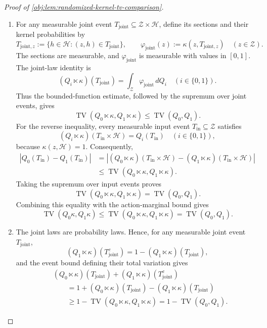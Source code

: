 \begin{proof}[Proof of \cref{obj:lem:randomized-kernel-tv-comparison}]
\begin{enumerate}
\item For any measurable joint event \(T_{\mathrm{joint}}\subseteq\mathcal Z\times\mathcal H\), define its sections and their kernel probabilities by
\[
T_{\mathrm{joint},z}
:=
\{h\in\mathcal H:(z,h)\in T_{\mathrm{joint}}\},
\qquad
\varphi_{\mathrm{joint}}(z)
:=
\kappa(z,T_{\mathrm{joint},z})
\quad(z\in\mathcal Z).
\]
The sections are measurable, and \(\varphi_{\mathrm{joint}}\) is measurable with values in \([0,1]\). The joint-law identity is
\[
(Q_i\ltimes\kappa)(T_{\mathrm{joint}})
=
\int_{\mathcal Z}\varphi_{\mathrm{joint}}\,dQ_i
\quad(i\in\{0,1\}).
\]
Thus the bounded-function estimate, followed by the supremum over joint events, gives
\[
\operatorname{TV}(Q_0\ltimes\kappa,Q_1\ltimes\kappa)
\le \operatorname{TV}(Q_0,Q_1).
\]
For the reverse inequality, every measurable input event \(T_{\mathrm{in}}\subseteq\mathcal Z\) satisfies
\[
(Q_i\ltimes\kappa)(T_{\mathrm{in}}\times\mathcal H)
=
Q_i(T_{\mathrm{in}})
\quad(i\in\{0,1\}),
\]
because \(\kappa(z,\mathcal H)=1\). Consequently,
\[
\begin{aligned}
|Q_0(T_{\mathrm{in}})-Q_1(T_{\mathrm{in}})|
&=
\left|
(Q_0\ltimes\kappa)(T_{\mathrm{in}}\times\mathcal H)
-
(Q_1\ltimes\kappa)(T_{\mathrm{in}}\times\mathcal H)
\right|\\
&\le
\operatorname{TV}(Q_0\ltimes\kappa,Q_1\ltimes\kappa).
\end{aligned}
\]
Taking the supremum over input events proves
\[
\operatorname{TV}(Q_0\ltimes\kappa,Q_1\ltimes\kappa)
=
\operatorname{TV}(Q_0,Q_1).
\]
Combining this equality with the action-marginal bound gives
\[
\operatorname{TV}(Q_0\kappa,Q_1\kappa)
\le
\operatorname{TV}(Q_0\ltimes\kappa,Q_1\ltimes\kappa)
=
\operatorname{TV}(Q_0,Q_1).
\]

\item The joint laws are probability laws. Hence, for any measurable joint event \(T_{\mathrm{joint}}\),
\[
(Q_1\ltimes\kappa)(T_{\mathrm{joint}}^c)
=
1-(Q_1\ltimes\kappa)(T_{\mathrm{joint}}),
\]
and the event bound defining their total variation gives
\[
\begin{aligned}
&(Q_0\ltimes\kappa)(T_{\mathrm{joint}})
 +(Q_1\ltimes\kappa)(T_{\mathrm{joint}}^c)\\
&\qquad=
1+(Q_0\ltimes\kappa)(T_{\mathrm{joint}})
 -(Q_1\ltimes\kappa)(T_{\mathrm{joint}})\\
&\qquad\ge
1-\operatorname{TV}(Q_0\ltimes\kappa,Q_1\ltimes\kappa)
=
1-\operatorname{TV}(Q_0,Q_1).
\end{aligned}
\]


\end{enumerate}
\end{proof}
